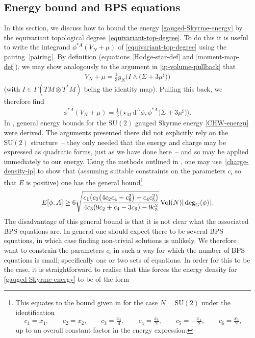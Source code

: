 \documentclass[10pt,a4paper]{amsart}
\newcommand{\SU}{{\mathrm{SU}}}
\newcommand{\1}{{\mathbb{1}}}
\def \d{\mathrm{d}}
\numberwithin{equation}{section}
\begin{document}
\subsection{Energy bound and BPS equations}%

In this section, we discuss how to bound the energy \eqref{gauged-Skyrme-energy} by the equivariant topological degree~\eqref{equivariant-top-degree}. To do this it is useful to write the integrand $\phi^{\ast A}(V_N+\mu)$ of \eqref{equivariant-top-degree} using the pairing~\eqref{pairing}. By definition (equations \eqref{Hodge-star-def} and \eqref{moment-map-def}), we may show analogously to the argument in \eqref{ip-volume-pullback} that
\begin{align*}
 V_N+\mu=\tfrac{1}{3}g_N\big(I\wedge\big(\Sigma+3\mu^\sharp\big)\big)
\end{align*}
(with $I\in\Gamma(TM\otimes T^\ast M)$ being the identity map). Pulling this back, we therefore find
\begin{align}\label{charge-density-ip}
 \phi^{\ast A}(V_N+\mu)=\tfrac{1}{3}\bigl\langle \star_{M}\d^A\phi,\phi^{\ast A}\big(\Sigma+3\mu^\sharp\big)\bigr\rangle.
\end{align}
In \cite{CorkHarlandWinyard2021gaugedskyrmelowbinding}, general energy bounds for the $\SU(2)$ gauged Skyrme energy \eqref{CHW-energu} were derived. The arguments presented there did not explicitly rely on the $\SU(2)$ structure~-- they only needed that the energy and charge may be expressed as quadratic forms, just as we have done here~-- and so may be applied immediately to our energy. Using the methods outlined in \cite{CorkHarlandWinyard2021gaugedskyrmelowbinding}, one may use~\eqref{charge-density-ip} to show that (assuming suitable constraints on the parameters $c_i$ so that $E$ is positive) one has the general bound\footnote{This equates to the bound given in \cite{CorkHarlandWinyard2021gaugedskyrmelowbinding} for the case $N=\SU(2)$ under the identification
\[
c_1=x_1,\qquad c_2 =x_2,\qquad c_3=\tfrac{x_5}{4},\qquad
 c_4 =\tfrac{x_6}{2},\qquad c_5=-\tfrac{x_4}{2},\qquad c_6 =\tfrac{x_3}{2},
 \]
up to an overall constant factor in the energy expression.}
\begin{align*}%
E[\phi,A]\geq6\sqrt{\frac{c_1\big(c_3\big(4c_2c_4-c_6^2\big)-c_4c_5^2\big)}{4c_3(9c_2+c_4-3c_6)-9c_5^2}}\,{\rm Vol}(N)|\deg_G(\phi)|.
\end{align*}
The disadvantage of this general bound is that it is not clear what the associated BPS equations are. In general one should expect there to be several BPS equations, in which case finding non-trivial solutions is unlikely. We therefore want to constrain the parameters $c_i$ in such a way for which the number of BPS equations is small; specifically one or two sets of equations. In order for this to be the case, it is straightforward to realise that this forces the energy density for \eqref{gauged-Skyrme-energy} to be of the form
\end{document}
